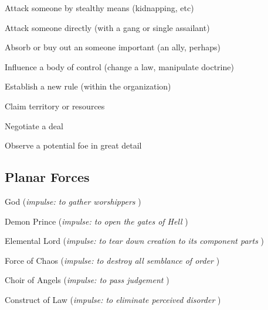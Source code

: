 \startitemize[1,packed]
         
\item Attack someone by stealthy means (kidnapping, etc)

         
\item Attack someone directly (with a gang or single assailant)

         
\item Absorb or buy out an someone important (an ally, perhaps)

         
\item Influence a body of control (change a law, manipulate doctrine)

         
\item Establish a new rule (within the organization)

         
\item Claim territory or resources

         
\item Negotiate a deal

         
\item Observe a potential foe in great detail

       
\stopitemize
       
\subsection{Planar Forces}    
       
\startitemize[1,packed]
         
\item God ({\em impulse: to gather worshippers} )

         
\item Demon Prince ({\em impulse: to open the gates of Hell} )

         
\item Elemental Lord ({\em impulse: to tear down creation to its component parts} )

         
\item Force of Chaos ({\em impulse: to destroy all semblance of order} )

         
\item Choir of Angels ({\em impulse: to pass judgement} )

         
\item Construct of Law ({\em impulse: to eliminate perceived disorder} )

       
\stopitemize
       
